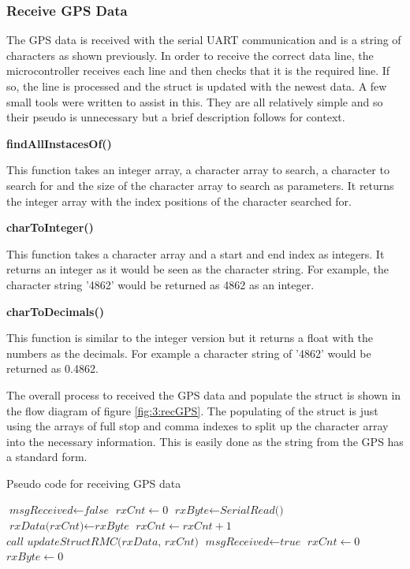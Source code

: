 \subsubsection{Receive GPS Data}
The GPS data is received with the serial UART communication and is a string of characters as shown previously. In order to receive the correct data line, the microcontroller receives each line and then checks that it is the required line. If so, the line is processed and the struct is updated with the newest data. A few small tools were written to assist in this. They are all relatively simple and so their pseudo is unnecessary but a brief description follows for context.\par
\textbf{findAllInstacesOf()}\par
This function takes an integer array, a character array to search, a character to search for and the size of the character array to search as parameters. It returns the integer array with the index positions of the character searched for.\par
\textbf{charToInteger()}\par
This function takes a character array and a start and end index as integers. It returns an integer as it would be seen as the character string. For example, the character string '4862' would be returned as 4862 as an integer.\par
\textbf{charToDecimals()}\par
This function is similar to the integer version but it returns a float with the numbers as the decimals. For example a character string of '4862' would be returned as 0.4862.\par
The overall process to received the GPS data and populate the struct is shown in the flow diagram of figure \ref{fig:3:recGPS}. The populating of the struct is just using the arrays of full stop and comma indexes to split up the character array into the necessary information. This is easily done as the string from the GPS has a standard form.
\begin{algorithm}
	\caption{Pseudo code for receiving GPS data}
	\label{alg:3:receiveGPS}
	\begin{algorithmic}[1]
		\State $\textit{msgReceived} \gets \textit{false}$
		\State $\textit{rxCnt} \gets 0$
		\State $\textit{rxByte} \gets \textit{SerialRead()}$
		\State $\textit{rxData(rxCnt)} \gets \textit{rxByte}$
		\State $\textit{rxCnt} \gets \textit{rxCnt} + 1$ 
		\EndIf
		\EndWhile
		\State $\textit{call updateStructRMC(rxData, rxCnt)}$
		\State $\textit{msgReceived} \gets \textit{true}$
		\EndIf
		\State $\textit{rxCnt} \gets 0$
		\State $\textit{rxByte} \gets 0$
		\EndWhile
	\end{algorithmic}
\end{algorithm}
